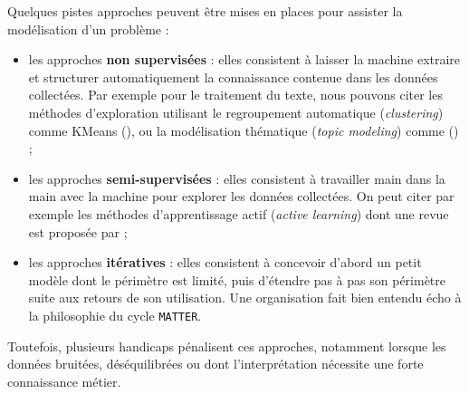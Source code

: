 			
			
			
			
			\begin{leftBarIdea}
				Quelques pistes approches peuvent être mises en places pour assister la modélisation d'un problème :
				\begin{itemize}
					\item les approches \textbf{non supervisées} :
					elles consistent à laisser la machine extraire et structurer automatiquement la connaissance contenue dans les données collectées.
					Par exemple pour le traitement du texte, nous pouvons citer les méthodes d'exploration utilisant le regroupement automatique (\textit{clustering}) comme KMeans (\cite{macqueen:1967:methods-classification-analysis}), ou la modélisation thématique (\textit{topic modeling}) comme  (\cite{blei-etal:2003:latent-dirichlet-allocation}) ;
					\item les approches \textbf{semi-supervisées} :
					elles consistent à travailler main dans la main avec la machine pour explorer les données collectées.
					On peut citer par exemple les méthodes d'apprentissage actif (\textit{active learning}) dont une revue est proposée par \cite{settles:2010:active-learning-literature} ;
					\item les approches \textbf{itératives} :
					elles consistent à concevoir d’abord un petit modèle dont le périmètre est limité, puis d'étendre pas à pas son périmètre suite aux retours de son utilisation.
					Une organisation fait bien entendu écho à la philosophie du cycle \texttt{MATTER}.
				\end{itemize}
				Toutefois, plusieurs handicaps pénalisent ces approches, notamment lorsque les données bruitées, déséquilibrées ou dont l'interprétation nécessite une forte connaissance métier.
			\end{leftBarIdea}
			
